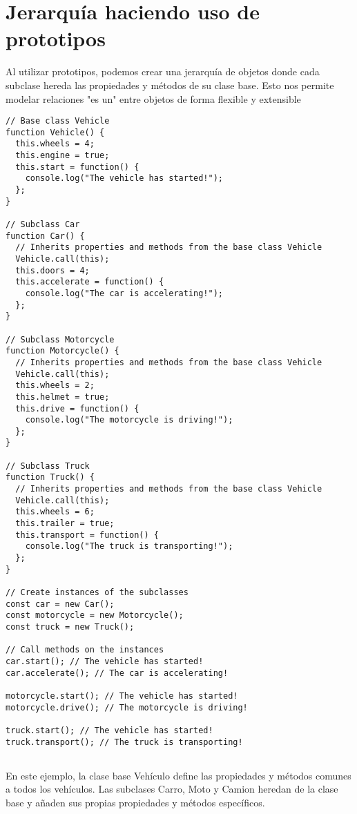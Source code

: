 \documentclass{article}
\begin{document}
\section{Jerarquía haciendo uso de prototipos}
Al utilizar prototipos, podemos crear una jerarquía de objetos donde cada subclase hereda las propiedades y métodos de su clase base. Esto nos permite modelar relaciones "es un" entre objetos de forma flexible y extensible

\begin{lstlisting}
// Base class Vehicle
function Vehicle() {
  this.wheels = 4;
  this.engine = true;
  this.start = function() {
    console.log("The vehicle has started!");
  };
}

// Subclass Car
function Car() {
  // Inherits properties and methods from the base class Vehicle
  Vehicle.call(this);
  this.doors = 4;
  this.accelerate = function() {
    console.log("The car is accelerating!");
  };
}

// Subclass Motorcycle
function Motorcycle() {
  // Inherits properties and methods from the base class Vehicle
  Vehicle.call(this);
  this.wheels = 2;
  this.helmet = true;
  this.drive = function() {
    console.log("The motorcycle is driving!");
  };
}

// Subclass Truck
function Truck() {
  // Inherits properties and methods from the base class Vehicle
  Vehicle.call(this);
  this.wheels = 6;
  this.trailer = true;
  this.transport = function() {
    console.log("The truck is transporting!");
  };
}

// Create instances of the subclasses
const car = new Car();
const motorcycle = new Motorcycle();
const truck = new Truck();

// Call methods on the instances
car.start(); // The vehicle has started!
car.accelerate(); // The car is accelerating!

motorcycle.start(); // The vehicle has started!
motorcycle.drive(); // The motorcycle is driving!

truck.start(); // The vehicle has started!
truck.transport(); // The truck is transporting!


\end{lstlisting}



En este ejemplo, la clase base Vehículo define las propiedades y métodos comunes a todos los vehículos. Las subclases Carro, Moto y Camion heredan de la clase base y añaden sus propias propiedades y métodos específicos.
\end{document}
